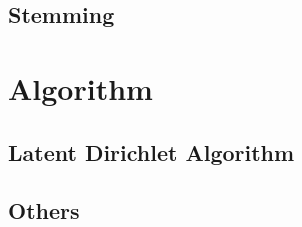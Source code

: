\subsection{Stemming}

\section{Algorithm}
\subsection{Latent Dirichlet Algorithm}
\subsection{Others}

